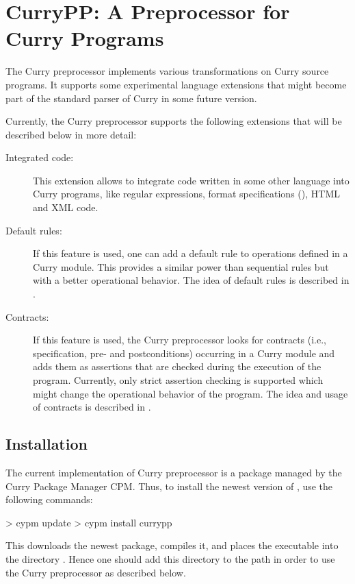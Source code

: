 \section{CurryPP: A Preprocessor for Curry Programs}

The Curry preprocessor 
implements
various transformations on Curry source programs.
It supports some experimental language extensions
that might become part of the standard parser of Curry
in some future version.

Currently, the Curry preprocessor
supports the following extensions that will be described below in more detail:

\begin{description}
\item[Integrated code:]
This extension allows to integrate
code written in some other language into Curry programs,
like regular expressions, format specifications (),
HTML and XML code.
\item[Default rules:]
If this feature is used, one can add a default rule
to operations defined in a Curry module.
This provides a similar power than sequential rules
but with a better operational behavior.
The idea of default rules is described in \cite{AntoyHanus16PADL}.
\item[Contracts:]
If this feature is used, the Curry preprocessor looks for contracts
(i.e., specification, pre- and postconditions) occurring in a Curry module
and adds them as assertions that are checked during
the execution of the program.
Currently, only strict assertion checking is supported
which might change the operational behavior of the program.
The idea and usage of contracts is described in \cite{AntoyHanus12PADL}.
\end{description}

\subsection{Installation}

The current implementation of Curry preprocessor is a package
managed by the Curry Package Manager CPM.
Thus, to install the newest version of ,
use the following commands:
%
\begin{curry}
> cypm update
> cypm install currypp
\end{curry}
%
This downloads the newest package, compiles it, and places
the executable  into the directory .
Hence one should add this directory to the path
in order to use the Curry preprocessor as described below.

